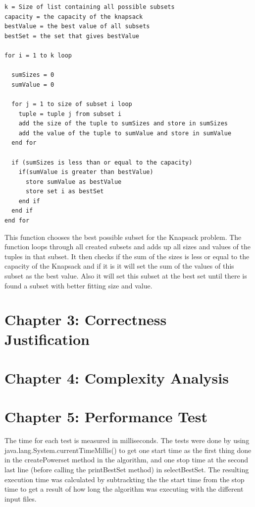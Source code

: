 \documentclass{article}
\begin{document}
\begin{verbatim}
k = Size of list containing all possible subsets
capacity = the capacity of the knapsack
bestValue = the best value of all subsets
bestSet = the set that gives bestValue

for i = 1 to k loop

  sumSizes = 0
  sumValue = 0

  for j = 1 to size of subset i loop
    tuple = tuple j from subset i
    add the size of the tuple to sumSizes and store in sumSizes
    add the value of the tuple to sumValue and store in sumValue
  end for

  if (sumSizes is less than or equal to the capacity)
    if(sumValue is greater than bestValue)
      store sumValue as bestValue
      store set i as bestSet
    end if
  end if
end for
\end{verbatim}

\noindent This function chooses the best possible subset for the Knapsack problem. The function loops through all created subsets and adds up all sizes and values of the tuples in that subset. It then checks if the sum of the sizes is less or equal to the capacity of the Knapsack and if it is it will set the sum of the values of this subset as the best value. Also it will set this subset at the best set until there is found a subset with better fitting size and value.\\


\section*{Chapter 3: Correctness Justification}

\section*{Chapter 4: Complexity Analysis}

\section*{Chapter 5: Performance Test}

The time for each test is measured in milliseconds. The tests were done by using java.lang.System.currentTimeMillis() to get one start time as the first thing done in the createPowerset method in the algorithm, and one stop time at the second last line (before calling the printBestSet method) in selectBestSet. The resulting execution time was calculated by subtrackting the the start time from the stop time to get a result of how long the algorithm was executing with the different input files.\\
\end{document}
